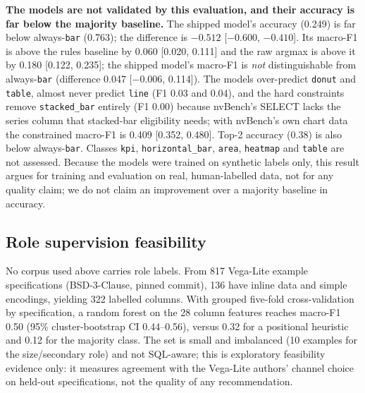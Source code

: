 \documentclass[11pt]{article}
\newcommand{\sql}[1]{\texttt{#1}}
\begin{document}
\textbf{The models are not validated by this evaluation, and their accuracy is far below the majority baseline.} The shipped model's accuracy (0.249) is far below always-\sql{bar} (0.763); the difference is $-0.512$ [$-0.600$, $-0.410$]. Its macro-F1 is above the rules baseline by 0.060 [0.020, 0.111] and the raw argmax is above it by 0.180 [0.122, 0.235]; the shipped model's macro-F1 is \emph{not} distinguishable from always-\sql{bar} (difference 0.047 [$-0.006$, 0.114]). The models over-predict \sql{donut} and \sql{table}, almost never predict \sql{line} (F1 0.03 and 0.04), and the hard constraints remove \sql{stacked\_bar} entirely (F1 0.00) because nvBench's SELECT lacks the series column that stacked-bar eligibility needs; with nvBench's own chart data the constrained macro-F1 is 0.409 [0.352, 0.480]. Top-2 accuracy (0.38) is also below always-\sql{bar}. Classes \sql{kpi}, \sql{horizontal\_bar}, \sql{area}, \sql{heatmap} and \sql{table} are not assessed. Because the models were trained on synthetic labels only, this result argues for training and evaluation on real, human-labelled data, not for any quality claim; we do not claim an improvement over a majority baseline in accuracy.

\subsection{Role supervision feasibility}
No corpus used above carries role labels. From 817 Vega-Lite example specifications \cite{satyanarayan2017vegalite} (BSD-3-Clause, pinned commit), 136 have inline data and simple encodings, yielding 322 labelled columns. With grouped five-fold cross-validation by specification, a random forest on the 28 column features reaches macro-F1 0.50 (95\% cluster-bootstrap CI 0.44--0.56), versus 0.32 for a positional heuristic and 0.12 for the majority class. The set is small and imbalanced (10 examples for the size/secondary role) and not SQL-aware; this is exploratory feasibility evidence only: it measures agreement with the Vega-Lite authors' channel choice on held-out specifications, not the quality of any recommendation.
\end{document}
